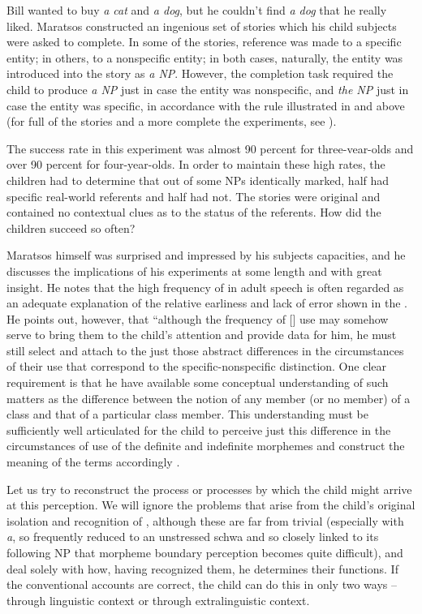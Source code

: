 \ea\label{ex:3:10}
 Bill wanted to buy \textit{a cat} and \textit{a dog}, but he couldn't find \textit{a dog} that he really liked.
\z
Maratsos constructed an ingenious set of stories which his child subjects were asked to complete. In some of the stories, reference was made to a specific entity; in others, to a nonspecific entity; in both cases, naturally, the entity was introduced into the story as \textit{a NP}. However, the completion task required the child to produce \textit{a NP} just in case the entity was nonspecific, and \textit{the NP} just in case the entity was specific, in accordance with the rule illustrated in  and  above (for full  of the stories and a more complete  the experiments, see \citealt{Maratsos1976}).

The success rate in this experiment was almost 90 percent for three-vear-olds and over 90 percent for four-year-olds. In order to maintain these high rates, the children had to determine that out of some NPs identically marked, half had specific real-world referents and half had not. The stories were original and contained no contextual clues as to the status of the referents. How did the children succeed so often?

Maratsos himself was surprised and impressed by his subjects capacities, and he discusses the implications of his experiments at
some length and with great insight. He notes that the high frequency of  in adult speech is often regarded as an adequate explanation of the relative earliness and lack of error shown in the   . He points out, however, that ``although the frequency of [] use may somehow serve to bring them to the child's atten\-tion and provide data for him, he must still select and attach to the  just those abstract differences in the circumstances of their use that correspond to the specific-nonspecific distinction. One clear requirement is that he have available some conceptual understanding of such matters as the difference between the notion of any member (or no member) of a class and that of a particular class member. This understanding must be sufficiently well articulated for the child to perceive just this difference in the circumstances of use of the definite and indefinite morphemes and construct the meaning of the terms accordingly \citep[453]{Maratsos1974}.

Let us try to reconstruct the process or processes by which the child might arrive at this perception. We will ignore the problems that arise from the child's original isolation and recognition of  , although these are far from trivial (especially with \textit{a}, so frequently reduced to an unstressed schwa and so closely linked to its following NP that morpheme boundary perception becomes quite difficult), and deal solely with how, having recognized them, he determines their functions. If the conventional accounts are correct, the child can do this in only two ways -- through linguistic context or through extralinguistic context.

